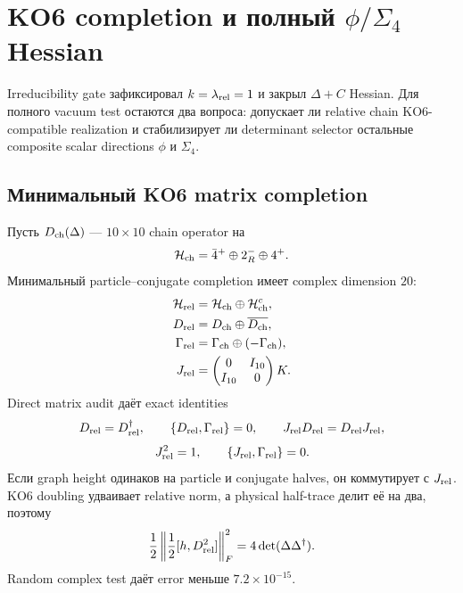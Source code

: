 \section{KO6 completion и полный \texorpdfstring{\(\phi/\Sigma_4\)}{phi/Sigma4} Hessian}

Irreducibility gate зафиксировал \(k=\lambda_{\rm rel}=1\) и закрыл
\(\Delta+C\) Hessian. Для полного vacuum test остаются два вопроса:
допускает ли relative chain KO6-compatible realization и стабилизирует ли
determinant selector остальные composite scalar directions
\(\phi\) и \(\Sigma_4\).

\subsection{Минимальный KO6 matrix completion}

Пусть \(D_{\rm ch}(\Delta)\) --- \(10\times10\) chain operator на
\begin{equation}
 \mathcal H_{\rm ch}=\bar4^+\oplus2_R^-\oplus4^+.
\end{equation}
Минимальный particle--conjugate completion имеет complex dimension \(20\):
\begin{align}
 \mathcal H_{\rm rel}&=\mathcal H_{\rm ch}\oplus\mathcal H_{\rm ch}^c,\\
 D_{\rm rel}&=D_{\rm ch}\oplus\overline{D_{\rm ch}},\\
 \Gamma_{\rm rel}&=\Gamma_{\rm ch}\oplus(-\Gamma_{\rm ch}),\\
 J_{\rm rel}&=
 \begin{pmatrix}0&I_{10}\\I_{10}&0\end{pmatrix}K.
 \label{eq:ps-relative-ko6-completion}
\end{align}
Direct matrix audit даёт exact identities
\begin{equation}
 D_{\rm rel}=D_{\rm rel}^\dagger,
 \qquad
 \{D_{\rm rel},\Gamma_{\rm rel}\}=0,
 \qquad
 J_{\rm rel}D_{\rm rel}=D_{\rm rel}J_{\rm rel},
\end{equation}
\begin{equation}
 J_{\rm rel}^2=1,
 \qquad
 \{J_{\rm rel},\Gamma_{\rm rel}\}=0.
\end{equation}
Если graph height одинаков на particle и conjugate halves, он коммутирует с
\(J_{\rm rel}\). KO6 doubling удваивает relative norm, а physical half-trace
делит её на два, поэтому
\begin{equation}
 \frac12\left\|\frac12[h,D_{\rm rel}^2]\right\|_F^2
 =4\det(\Delta\Delta^\dagger).
 \label{eq:ps-relative-ko6-selector}
\end{equation}
Random complex test даёт error меньше \(7.2\times10^{-15}\).

